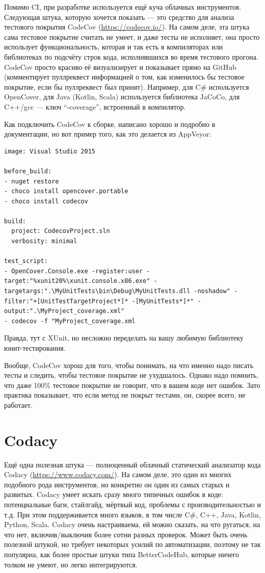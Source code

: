 \documentclass[a5paper]{article}
\begin{document}
Помимо CI, при разработке используется ещё куча облачных инструментов. Следующая штука, которую хочется показать --- это средство для анализа тестового покрытия CodeCov (\url{https://codecov.io/}). На самом деле, эта штука сама тестовое покрытие считать не умеет, и даже тесты не исполняет, она просто использует функциональность, которая и так есть в компиляторах или библиотеках по подсчёту строк кода, исполнявшихся во время тестового прогона. CodeCov просто красиво её визуализирует и показывает прямо на GitHub (комментирует пуллреквест информацией о том, как изменилось бы тестовое покрытие, если бы пуллреквест был принят). Например, для C\# используется OpenCover, для Java (Kotlin, Scala) используется библиотека JaCoCo, для C++/gcc --- ключ ``-coverage'', встроенный в компилятор.

Как подключить CodeCov к сборке, написано хорошо и подробно в документации, но вот пример того, как это делается из AppVeyor:

\begin{verbatim}
image: Visual Studio 2015

before_build:
- nuget restore
- choco install opencover.portable
- choco install codecov

build:
  project: CodecovProject.sln
  verbosity: minimal

test_script:
- OpenCover.Console.exe -register:user -target:"%xunit20%\xunit.console.x86.exe" -targetargs:".\MyUnitTests\bin\Debug\MyUnitTests.dll -noshadow" -filter:"+[UnitTestTargetProject*]* -[MyUnitTests*]*" -output:".\MyProject_coverage.xml"
- codecov -f "MyProject_coverage.xml
\end{verbatim}

Правда, тут с XUnit, но несложно переделать на вашу любимую библиотеку юнит-тестирования.

Вообще, CodeCov хорош для того, чтобы понимать, на что именно надо писать тесты и следить, чтобы тестовое покрытие не ухудшалось. Однако надо помнить, что даже 100\% тестовое покрытие не говорит, что в вашем коде нет ошибок. Зато практика показывает, что если метод не покрыт тестами, он, скорее всего, не работает.

\section{Codacy}

Ещё одна полезная штука --- полноценный облачный статический анализатор кода Codacy (\url{https://www.codacy.com/}). На самом деле, это один из многих подобного рода инструментов, но конкретно он один из самых старых и развитых. Codacy умеет искать сразу много типичных ошибок в коде: потенциальные баги, стайлгайд, мёртвый код, проблемы с производительностью и т.д. При этом поддерживается много языков, в том числе C\#, C++, Java, Kotlin, Python, Scala. Codacy очень настраиваема, ей можно сказать, на что ругаться, на что нет, включив/выключив более сотни разных проверок. Может быть очень полезной штукой, но требует некоторых усилий по автоматизации, поэтому не так популярна, как более простые штуки типа BetterCodeHub, которые ничего толком не умеют, но легко интегрируются.
\end{document}
